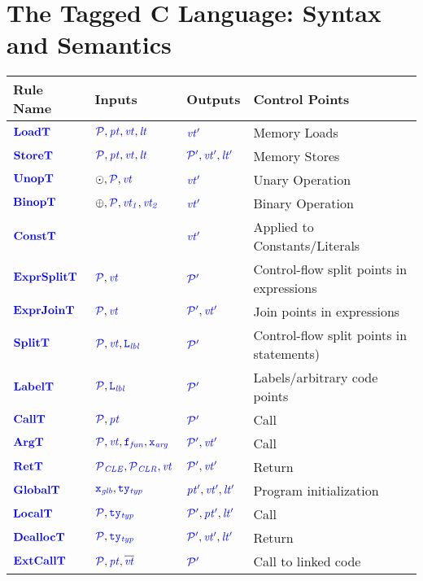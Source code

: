 \documentclass{llncs}
\begin{document}
\section{The Tagged C Language: Syntax and Semantics}
\label{sec:language}

\begin{table}[t]
  \begin{tabular}{|l|l|l|l|}
    \hline
    Rule Name & Inputs & Outputs & Control Points \\
    \hline
    \(\loadtname\)      & \(\loadtargs\)         & \(\loadtres\)      & Memory Loads \\
    \(\storetname\)     & \(\storetargs\)        & \(\storetres\)     & Memory Stores \\
    \(\unoptname\)      & \(\unoptargs\)         & \(\unoptres\)      & Unary Operation \\
    \(\binoptname\)     & \(\binoptargs\)        & \(\binoptres\)     & Binary Operation \\
    \(\consttname\)     &                        & \(\consttres\)     & Applied to Constants/Literals \\
    \(\exprsplittname\) & \(\exprsplittargs\)    & \(\exprsplittres\) & Control-flow split points in expressions \\
    \(\exprjointname\)  & \(\exprjointargs\)     & \(\exprjointres\)  & Join points in expressions \\
    \(\splittname\)     & \(\splittargs\)        & \(\splittres\)     & Control-flow split points in statements)\\
    \(\labeltname\)     & \(\labeltargs\)        & \(\labeltres\)     & Labels/arbitrary code points \\
    \(\calltname\)      & \(\calltargs\)         & \(\calltres\)      & Call \\
    \(\argtname\)       & \(\argtargs\)          & \(\argtres\)       & Call \\
    \(\rettname\)       & \(\rettargs\)          & \(\rettres\)       & Return \\
    \(\globaltname\)    & \(\globaltargs\)       & \(\globaltres\)    & Program initialization \\
    \(\localtname\)     & \(\localtargs\)        & \(\localtres\)     & Call \\
    \(\dealloctname\)   & \(\dealloctargs\)      & \(\dealloctres\)   & Return \\
    \(\extcalltname\)   & \(\extcalltargs\)      & \(\extcalltres\)   & Call to linked code \\

\end{tabular}
\end{table}
\end{document}
